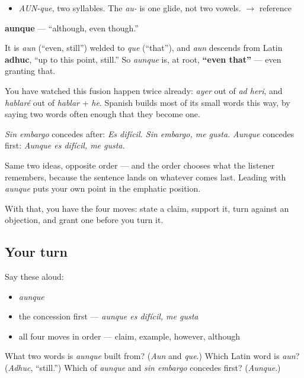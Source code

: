 \begin{sounds}
\begin{itemize}
\raggedright
  \item \emph{AUN-que}, two syllables. The \emph{au-} is one glide, not two vowels. $\to$ reference
\end{itemize}
\end{sounds}

\begin{cousinweb}
\textbf{aunque} — \textquotedblleft{}although, even though.\textquotedblright{}

It is \emph{aun} (\textquotedblleft{}even, still\textquotedblright{}) welded to \emph{que} (\textquotedblleft{}that\textquotedblright{}), and \emph{aun} descends from Latin \textbf{adhuc}, \textquotedblleft{}up to this point, still.\textquotedblright{} So \emph{aunque} is, at root, \textbf{\textquotedblleft{}even that\textquotedblright{}} — even granting that.

You have watched this fusion happen twice already: \emph{ayer} out of \emph{ad heri}, and \emph{hablaré} out of \emph{hablar} + \emph{he}. Spanish builds most of its small words this way, by saying two words often enough that they become one.
\end{cousinweb}

\begin{grammarlens}[title={What you've built}]
\emph{Sin embargo} concedes after: \emph{Es difícil. Sin embargo, me gusta.} \emph{Aunque} concedes first: \emph{Aunque es difícil, me gusta.}

Same two ideas, opposite order — and the order chooses what the listener remembers, because the sentence lands on whatever comes last. Leading with \emph{aunque} puts your own point in the emphatic position.

With that, you have the four moves: state a claim, support it, turn against an objection, and grant one before you turn it.
\end{grammarlens}

\subsection*{Your turn}
Say these aloud:

\begin{itemize}
\raggedright
  \item \emph{aunque}
  \item the concession first — \emph{aunque es difícil, me gusta}
  \item all four moves in order — claim, example, however, although
\end{itemize}

\begin{tcolorbox}[breakable,colback=teal!4,colframe=teal!35!black,title={Before you move on}]
What two words is \emph{aunque} built from? (\emph{Aun} and \emph{que}.) Which Latin word is \emph{aun}? (\emph{Adhuc}, \textquotedblleft{}still.\textquotedblright{}) Which of \emph{aunque} and \emph{sin embargo} concedes first? (\emph{Aunque}.)
\end{tcolorbox}
